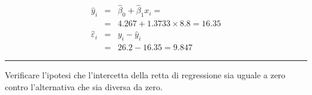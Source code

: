 \documentclass[
  11pt,
]{book}
\theoremstyle{mytheoremstyle}
\theoremstyle{mydefstyle}
\newenvironment{sol}
  {
  \begin{tcolorbox}[enhanced,breakable,arc=0.1mm,boxrule=1pt,colback=white,colframe=iblue,
  title=\bf \fontfamily{lmss}\selectfont \hspace{.5 cm} Soluzione,drop fuzzy shadow]

}{
\end{tcolorbox}
  }
\begin{document}
\begin{sol}
\begin{eqnarray*}
\hat y_i &=&\hat\beta_0+\hat\beta_1 x_i=\\ 
&=& 4.267 + 1.3733 \times 8.8 = 16.35 \\ 
\hat \varepsilon_i &=& y_i-\hat y_i\\ 
&=& 26.2 - 16.35 = 9.847  
\end{eqnarray*}

\end{sol}

\begin{center}\rule{0.5\linewidth}{0.5pt}\end{center}

Verificare l'ipotesi che l'intercetta della retta di regressione sia uguale a
zero contro l'alternativa che sia diversa da zero.
\end{document}
